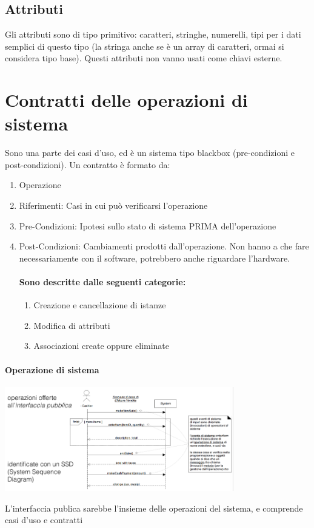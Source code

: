 \documentclass[12pt, a4paper, openany, twoside]{book}
\begin{document}
\subsection{Attributi}
Gli attributi sono di tipo primitivo: caratteri, stringhe, numerelli, tipi per
i dati semplici di questo tipo (la stringa anche se è un array di caratteri, 
ormai si considera tipo base). Questi attributi non vanno usati come chiavi esterne.
\section{Contratti delle operazioni di sistema}
Sono una parte dei casi d'uso, ed è un sistema tipo blackbox (pre-condizioni e 
post-condizioni). Un contratto è formato da:
\begin{enumerate}
	\item Operazione
	\item Riferimenti: Casi in cui può verificarsi l'operazione
	\item Pre-Condizioni: Ipotesi sullo stato di sistema PRIMA dell'operazione
	\item Post-Condizioni: Cambiamenti prodotti dall'operazione. Non hanno 
	a che fare necessariamente con il software, potrebbero anche riguardare
	l'hardware.
	\paragraph{Sono descritte dalle seguenti categorie:}
	\begin{enumerate}
		\item Creazione e cancellazione di istanze
		\item Modifica di attributi
		\item Associazioni create oppure eliminate
	\end{enumerate}
\end{enumerate}
\paragraph{Operazione di sistema}
\begin{center}
\includegraphics[width=0.75\textwidth]{11}
\end{center}
L'interfaccia publica sarebbe l'insieme delle operazioni del sistema, e comprende
casi d'uso e contratti
\end{document}
